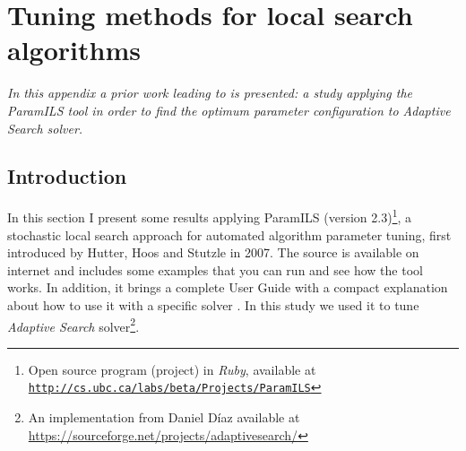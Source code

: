 \chapter{Tuning methods for local search algorithms}
\label{chap:prior_paramils}
\textit{In this appendix a prior work leading to \posl{} is presented: a study applying the {\sc ParamILS} tool in order to find the optimum parameter configuration to {\it Adaptive Search} solver.}

\vspace{2ex}\vfill
\minitoc
\newpage



\section{Introduction}

In this section I present some results applying {\sc ParamILS} (version 2.3)\footnote{Open source program (project) in {\it Ruby}, available at \href{http://cs.ubc.ca/labs/beta/Projects/ParamILS}{\texttt{http://cs.ubc.ca/labs/beta/Projects/ParamILS}}}, a stochastic local search approach for automated algorithm parameter tuning, first introduced by Hutter, Hoos and St\:utzle in 2007. The source is available on internet and includes some examples that you can run and see how the tool works. In addition, it brings a complete User Guide with a compact explanation about how to use it with a specific solver \cite{Hutter2008,Hutter2009}. In this study we used it to tune {\it Adaptive Search} solver\footnote{An implementation from Daniel D\'{i}az available at \href{https://sourceforge.net/projects/adaptivesearch/}{https://sourceforge.net/projects/adaptivesearch/}}. %

